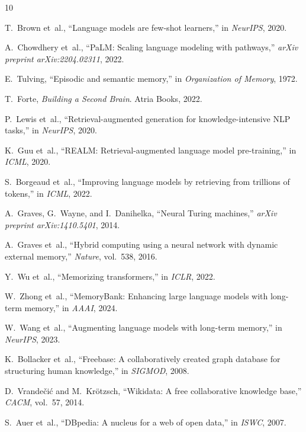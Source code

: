 \documentclass[conference]{IEEEtran}
\begin{document}

\begin{thebibliography}{10}

T.~Brown et~al., ``Language models are few-shot learners,'' in \emph{NeurIPS}, 2020.

A.~Chowdhery et~al., ``PaLM: Scaling language modeling with pathways,'' \emph{arXiv preprint arXiv:2204.02311}, 2022.

E.~Tulving, ``Episodic and semantic memory,'' in \emph{Organization of Memory}, 1972.

T.~Forte, \emph{Building a Second Brain}. Atria Books, 2022.

P.~Lewis et~al., ``Retrieval-augmented generation for knowledge-intensive NLP tasks,'' in \emph{NeurIPS}, 2020.

K.~Guu et~al., ``REALM: Retrieval-augmented language model pre-training,'' in \emph{ICML}, 2020.

S.~Borgeaud et~al., ``Improving language models by retrieving from trillions of tokens,'' in \emph{ICML}, 2022.

A.~Graves, G.~Wayne, and I.~Danihelka, ``Neural Turing machines,'' \emph{arXiv preprint arXiv:1410.5401}, 2014.

A.~Graves et~al., ``Hybrid computing using a neural network with dynamic external memory,'' \emph{Nature}, vol.~538, 2016.

Y.~Wu et~al., ``Memorizing transformers,'' in \emph{ICLR}, 2022.

W.~Zhong et~al., ``MemoryBank: Enhancing large language models with long-term memory,'' in \emph{AAAI}, 2024.

W.~Wang et~al., ``Augmenting language models with long-term memory,'' in \emph{NeurIPS}, 2023.

K.~Bollacker et~al., ``Freebase: A collaboratively created graph database for structuring human knowledge,'' in \emph{SIGMOD}, 2008.

D.~Vrande{\v{c}}i{\'c} and M.~Kr{\"o}tzsch, ``Wikidata: A free collaborative knowledge base,'' \emph{CACM}, vol.~57, 2014.

S.~Auer et~al., ``DBpedia: A nucleus for a web of open data,'' in \emph{ISWC}, 2007.


\end{thebibliography}
\end{document}
